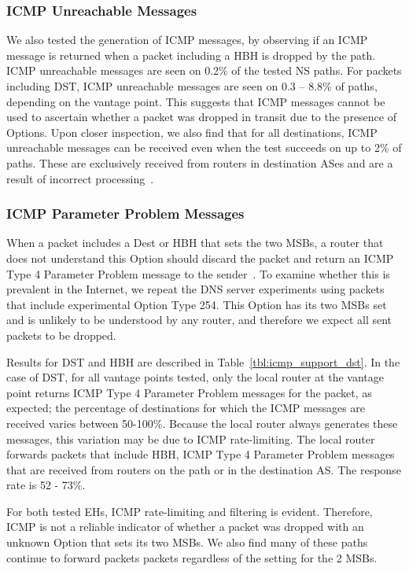 \documentclass[conference]{IEEEtran}
\begin{document}
\subsubsection{ICMP Unreachable Messages}

We also tested the generation of
ICMP messages, by observing if an ICMP message is returned when a packet including a HBH is dropped by the path. ICMP unreachable messages are seen on 0.2\% of the tested NS paths. For packets including DST, ICMP unreachable messages are seen on 0.3 – 8.8\% of paths, depending on the vantage point.
This suggests that ICMP messages cannot be used to ascertain whether a packet was dropped in transit due to the presence of Options.
Upon closer inspection, we also find that for all destinations, ICMP unreachable messages can be received even when the test succeeds on up to 2\% of paths. These are exclusively received from routers in destination ASes and are a result of incorrect processing~\cite{RFC8200}.

\subsubsection{ICMP Parameter Problem Messages}

When a packet includes a Dest or HBH that sets the two MSBs, a router that does not understand this Option should discard the packet and return an ICMP Type 4 Parameter Problem message to the sender~\cite{RFC8200}. To examine whether this is prevalent in the Internet, we repeat the DNS server experiments using packets that include experimental Option Type 254. This Option has its two MSBs set and is unlikely to be understood by any router, and therefore we expect all sent packets to be dropped.

Results for DST and HBH are described in Table~\ref{tbl:icmp_support_dst}.
In the case of DST, for all vantage points tested, only the local router at the vantage point returns ICMP Type 4 Parameter Problem messages for the packet, as expected; the percentage of destinations for which the ICMP messages are received varies between 50-100\%. Because the local router always generates these messages, this variation may be due to ICMP rate-limiting. 
The local router forwards packets that include HBH,  ICMP Type 4 Parameter Problem messages that are received from routers on the path or in the destination AS. The response rate is 52 - 73\%. 

For both tested EHs, ICMP rate-limiting and filtering is evident. Therefore, ICMP is not a reliable indicator of whether a packet was dropped with an unknown Option that sets its two MSBs. We also find many of these paths continue to forward packets packets regardless of the setting for the 2 MSBs.
\end{document}

